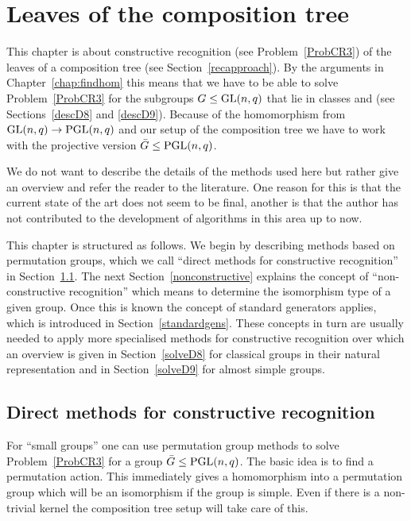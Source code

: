 
\chapter{Leaves of the composition tree}
\label{chap:leaves}

This chapter is about constructive recognition (see
Problem~\ref{ProbCR3}) of the leaves of a
composition tree (see Section~\ref{recapproach}). By the arguments in
Chapter~\ref{chap:findhom} this means that we have to be
able to solve Problem~\ref{ProbCR3} for the subgroups $G \le \GL(n,q)$
that lie in classes  and  (see Sections~\ref{descD8} and
\ref{descD9}). Because of the homomorphism from $\GL(n,q) \to
\PGL(n,q)$ and our setup of the composition tree we have
to work with the projective version $\bar G \le \PGL(n,q)$.

We do not want to describe the details of the methods used here but
rather give an overview and refer the reader to the literature.
One reason for this is that the current state of the art does not seem
to be final, another is that the author has not contributed to the
development of algorithms in this area up to now.

This chapter is structured as follows. We begin by describing
methods based on permutation groups, which we call ``direct methods
for constructive recognition'' in Section~\ref{solvedirect}. The
next Section~\ref{nonconstructive} explains the concept of
``non-constructive recognition'' which means to determine
the isomorphism type of a given group. Once this is known the
concept of standard generators applies, which is introduced in
Section~\ref{standardgens}. These concepts in turn are usually needed to apply
more specialised methods for constructive recognition over which an
overview is given in Section~\ref{solveD8} for classical groups in
their natural representation and in
Section~\ref{solveD9} for almost simple groups.

\section{Direct methods for constructive recognition}
\label{solvedirect}

For ``small groups'' one can use permutation group methods to solve
Problem~\ref{ProbCR3} for a group $\bar G \le \PGL(n,q)$. The basic idea is
to find a permutation action. This immediately gives a homomorphism
into a permutation group which will be an isomorphism if the group is
simple. Even if there is a non-trivial kernel the composition tree setup
will take care of this.

